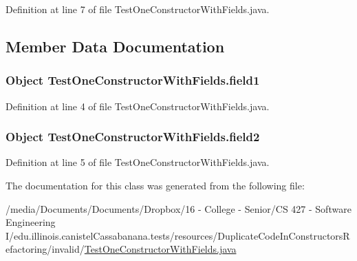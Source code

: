 Definition at line 7 of file TestOneConstructorWithFields.java.



\subsection{Member Data Documentation}
\hypertarget{classTestOneConstructorWithFields_ae29939df706fc5cae81183a68637e13a}{
\subsubsection[{field1}]{\setlength{\rightskip}{0pt plus 5cm}Object {\bf TestOneConstructorWithFields.field1}}}
\label{classTestOneConstructorWithFields_ae29939df706fc5cae81183a68637e13a}


Definition at line 4 of file TestOneConstructorWithFields.java.

\hypertarget{classTestOneConstructorWithFields_ab0249470b387455131b2fc701107daf9}{
\subsubsection[{field2}]{\setlength{\rightskip}{0pt plus 5cm}Object {\bf TestOneConstructorWithFields.field2}}}
\label{classTestOneConstructorWithFields_ab0249470b387455131b2fc701107daf9}


Definition at line 5 of file TestOneConstructorWithFields.java.



The documentation for this class was generated from the following file:\begin{DoxyCompactItemize}
\item 
/media/Documents/Documents/Dropbox/16 -\/ College -\/ Senior/CS 427 -\/ Software Engineering I/edu.illinois.canistelCassabanana.tests/resources/DuplicateCodeInConstructorsRefactoring/invalid/\hyperlink{TestOneConstructorWithFields_8java}{TestOneConstructorWithFields.java}\end{DoxyCompactItemize}
